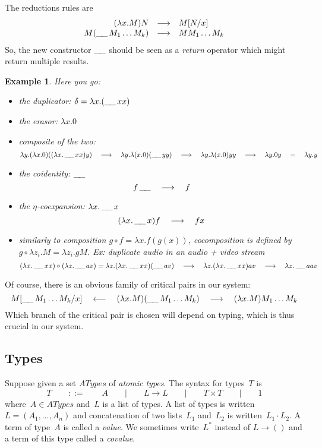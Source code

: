 \documentclass[a4paper,titlepage]{article}
\newcommand{\ATypes}{ATypes}
\newcommand{\ret}{\mathop{\_\hspace{-.3ex}\_}}
\newtheorem{example}[theorem]{Example}
\begin{document}
The reductions rules are
\[
\begin{array}{r@{\quad}c@{\quad}l}
  (\lambda x.M)N&\longrightarrow&M[N/x]\\
  M(\ret M_1\ldots M_k)&\longrightarrow&MM_1\ldots M_k\\
\end{array}
\]
So, the new constructor $\ret$ should be seen as a \emph{return} operator which
might return multiple results.

\begin{example}
  Here you go:
  \begin{itemize}
  \item the duplicator: $\delta=\lambda x.(\ret xx)$
  \item the erasor: $\lambda x.0$
  \item composite of the two:
    \[
    \lambda y.(\lambda x.0)((\lambda x.\ret xx)y)
    \quad\longrightarrow\quad
    \lambda y.\lambda(x.0)(\ret yy)
    \quad\longrightarrow\quad
    \lambda y.\lambda(x.0)yy
    \quad\longrightarrow\quad
    \lambda y.0y
    \quad=\quad
    \lambda y.y
    \]
  \item the coidentity: $\ret$
    \[
    f\ret\quad\longrightarrow\quad f
    \]
  \item the $\eta$-coexpansion: $\lambda x.\ret x$
    \[
    (\lambda x.\ret x)f\quad\longrightarrow\quad fx
    \]
  \item similarly to composition $g\circ f=\lambda x.f(g(x))$, cocomposition is
    defined by $g\circ \lambda z_i.M=\lambda z_i.g M$. Ex: duplicate audio in an
    audio + video stream
    \[
    (\lambda x.\ret x x)\circ(\lambda z.\ret a v)
    =
    \lambda z.(\lambda x.\ret xx)(\ret av)
    \quad\longrightarrow\quad
    \lambda z.(\lambda x.\ret xx)av
    \quad\longrightarrow\quad
    \lambda z.\ret aav
    \]
  \end{itemize}
\end{example}

Of course, there is an obvious family of critical pairs in our system:
\[
M[\ret M_1\ldots M_k/x]
\quad\longleftarrow\quad
(\lambda x.M)(\ret M_1\ldots M_k)
\quad\longrightarrow\quad
(\lambda x.M)M_1\ldots M_k
\]
Which branch of the critical pair is chosen will depend on typing, which is thus
crucial in our system.

\subsection{Types}
Suppose given a set $\ATypes$ of \emph{atomic types}. The syntax for types~$T$ is
\[
T
\qquad::=\qquad
A
\qquad|\qquad
L\to L
\qquad|\qquad
T \times T
\qquad|\qquad
1
\]
where~$A\in\ATypes$ and~$L$ is a list of types. A list of types is written
\hbox{$L=(A_1,\ldots,A_n)$} and concatenation of two lists~$L_1$ and~$L_2$ is
written~$L_1\cdot L_2$. A term of type~$A$ is called a \emph{value}. We
sometimes write~$L^*$ instead of $L\to()$ and a term of this type called a
\emph{covalue}.
\end{document}
